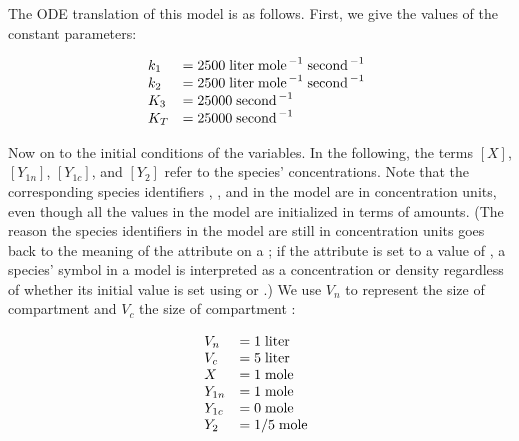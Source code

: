 The ODE translation of this model is as follows.  First, we give
the values of the constant parameters:
\begin{linenomath}
  \begin{equation*}
    \begin{array}{@{}lll@{}}
      k_1   & = 2500\; \unit{liter} \; \unit{mole}^{\,-1}\; \unit{second}^{\,-1}\\
      k_2   & = 2500\; \unit{liter} \; \unit{mole}^{\,-1}\; \unit{second}^{\,-1}\\
      K_3   & = 25000\; \unit{second}^{\,-1}\\
      K_T   & = 25000\; \unit{second}^{\,-1}\\
    \end{array}
  \end{equation*}
\end{linenomath}
Now on to the initial conditions of the variables.  In the
following, the terms $[X]$, $[Y_{1n}]$, $[Y_{1c}]$, and $[Y_2]$
refer to the species' concentrations.  Note that the corresponding
species identifiers , , 
and  in the model are in concentration units, even
though all the values in the model are initialized in terms of
amounts.  (The reason the species identifiers in the model are
still in concentration units goes back to the meaning of the
 attribute on a \Species; if the
attribute is set to a value of , a species' symbol in a
model is interpreted as a concentration or density regardless of
whether its initial value is set using  or
.)  We use $V_n$ to represent the size
of compartment  and $V_c$ the size of compartment
:
\begin{linenomath}
  \begin{equation*}
    \begin{array}{@{}lll@{}}
      V_n    & = 1\; \unit{liter}\\
      V_c    & = 5\; \unit{liter}\\
      X      & = 1\; \unit{mole}\\
      Y_{1n} & = 1\; \unit{mole}\\
      Y_{1c} & = 0\; \unit{mole}\\
      Y_2    & = 1/5\; \unit{mole}\\
    \end{array}
  \end{equation*}
\end{linenomath}
